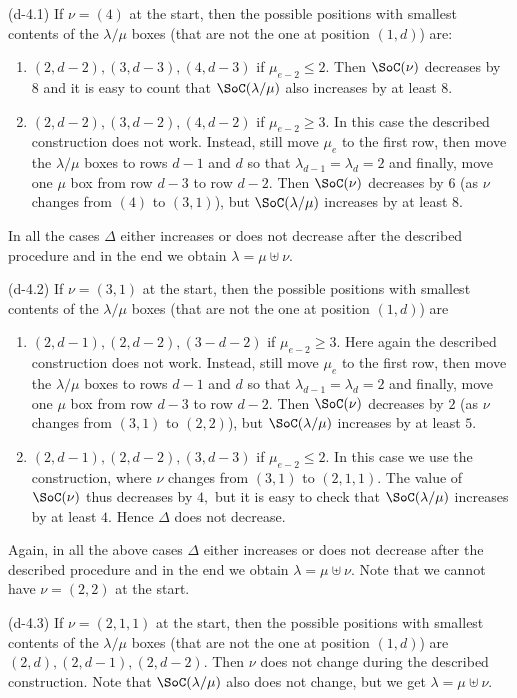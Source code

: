 \documentclass[12pt,dvipsnames,accepted=2016-08-18,a4paper,onecolumn]{quantumarticle}
\def\la{\lambda}
\def\la{\lambda}
\numberwithin{equation}{section}
\theoremstyle{definition}
\begin{document}
(d-4.1) If $\nu=(4)$ at the start, then the possible positions with smallest contents of the  $\la/\mu$ boxes (that are not the one at position $(1,d)$) are:
\begin{enumerate}
    \item $(2,d-2),(3,d-3),(4,d-3)$ if $\mu_{e-2} \leq 2.$ Then $\SoC(\nu)$ decreases by $8$ and it is easy to count that $\SoC(\la/\mu)$ also increases by at least $8.$ 
    \item $(2,d-2),(3,d-2),(4,d-2)$ if $\mu_{e-2} \geq 3.$  In this case the described construction does not work. Instead, still move $\mu_e$ to the first row, then move the $\la/\mu$ boxes to rows $d-1$ and $d$ so that $\la_{d-1}=\la_d=2$ and finally, move one $\mu$ box from row $d-3$ to row $d-2.$ Then $\SoC(\nu)$ decreases by $6$ (as $\nu$ changes from $(4)$ to $(3,1)$), but  $\SoC(\la/\mu)$ increases by at least $8.$
\end{enumerate}

In all the cases $\Delta$ either increases or does not decrease after the described procedure and in the end we obtain $\la=\mu \uplus \nu.$

(d-4.2) If $\nu=(3,1)$ at the start, then the possible positions with smallest contents of the  $\la/\mu$ boxes (that are not the one at position $(1,d)$) are
\begin{enumerate}
    \item $(2,d-1),(2,d-2),(3-d-2)$ if $\mu_{e-2}\geq 3.$ Here again the described construction does not work. Instead, still move $\mu_e$ to the first row, then move the $\la/\mu$ boxes to rows $d-1$ and $d$ so that $\la_{d-1}=\la_d=2$ and finally, move one $\mu$ box from row $d-3$ to row $d-2.$ Then $\SoC(\nu)$ decreases by $2$ (as $\nu$ changes from $(3,1)$ to $(2,2)$), but  $\SoC(\la/\mu)$ increases by at least $5.$
    \item $(2,d-1),(2,d-2),(3,d-3)$ if $\mu_{e-2}\leq 2.$ In this case we use the construction, where $\nu$ changes from $(3,1)$ to $(2,1,1).$ The value of $\SoC(\nu)$ thus decreases by $4,$ but it is easy to check that  $\SoC(\la/\mu)$ increases by at least $4.$ Hence $\Delta$ does not decrease.
\end{enumerate}
Again, in all the above  cases $\Delta$ either increases or does not decrease after the described procedure and in the end we obtain $\la=\mu \uplus \nu.$
Note that we cannot have $\nu=(2,2)$ at the start.

(d-4.3) If $\nu=(2,1,1)$ at the start, then the possible positions with smallest contents of the  $\la/\mu$ boxes (that are not the one at position $(1,d)$) are $(2,d),(2,d-1),(2,d-2).$ Then $\nu$ does not change during the described construction. Note that $\SoC(\la/\mu)$ also does not change, but we get $\la=\mu \uplus \nu.$
\end{document}
